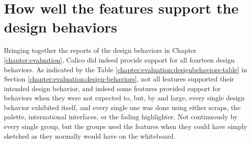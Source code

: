 \documentclass[12pt,fleqn]{ucithesis}
\begin{document}


\section{How well the features support the design behaviors}
\label{discussion:designbehaviors}



Bringing together the reports of the design behaviors in Chapter \ref{chapter:evaluation}, Calico did indeed provide support for all fourteen design behaviors. As indicated by the Table \ref{chapter:evaluation:designbehaviors-table} in Section \ref{chapter:evaluation:design-behaviors}, not all features supported their intended design behavior, and indeed some features provided support for behaviors when they were not expected to, but, by and large, every single design behavior exhibited itself, and every single one was done using either scraps, the palette, international interfaces, or the fading highlighter. Not continuously by every single group, but the groups used the features when they could have simply sketched as they normally would have on the whiteboard. 
\end{document}
